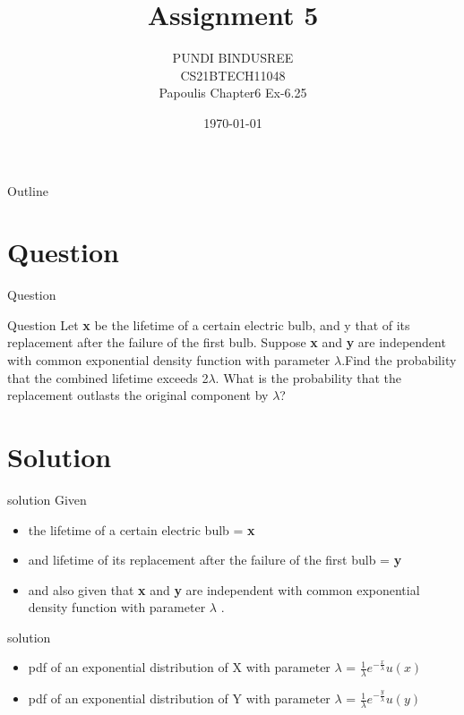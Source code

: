 \documentclass{beamer}
\title{Assignment 5}
\author{PUNDI BINDUSREE \\
     CS21BTECH11048 \\
     Papoulis Chapter6 Ex-6.25\\ }
\date{\today}
\begin{document}
     
\begin{frame}
    \maketitle    
\end{frame}
     
     \logo{}
     
     \begin{frame}{Outline}
    \tableofcontents
     \end{frame}


\section{Question}
\begin{frame}{Question}
\begin{block}{Question}
Let \textbf{x} be the lifetime of a certain electric bulb, and y that of its replacement after the failure of the first bulb. Suppose \textbf{x} and \textbf{y} are independent with common exponential density function with parameter $\lambda$.Find the probability that the combined lifetime exceeds 2$\lambda$. What is the probability that the replacement outlasts the original component by $\lambda$?
\end{block}
\end{frame}


\section{Solution}
\begin{frame}{solution}
Given\\
\begin{itemize}
    \item the lifetime of a certain electric bulb = \textbf{x}
    \item and lifetime of its replacement after the failure of the first bulb = \textbf{y}
    \item and also given that \textbf{x} and \textbf{y} are independent with common exponential density function with parameter $\lambda$ .
\end{itemize}
\end{frame}


\begin{frame}{solution}
\begin{itemize}
    \item pdf of an exponential distribution of X with parameter $\lambda$ = $\frac{1}{\lambda}e^{-\frac{x}{\lambda}}u(x)$
    \item pdf of an exponential distribution of Y with parameter $\lambda$ = $\frac{1}{\lambda}e^{-\frac{y}{\lambda}}u(y)$
\end{itemize}
\end{frame}
     
\end{document}
